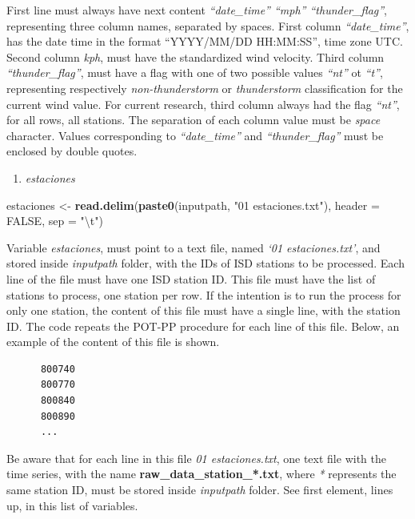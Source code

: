 \documentclass[12pt,oneside]{reedthesis}
\newenvironment{Shaded}{\begin{snugshade}}{\end{snugshade}}
\newcommand{\CharTok}[1]{\textcolor[rgb]{0.31,0.60,0.02}{#1}}
\newcommand{\DataTypeTok}[1]{\textcolor[rgb]{0.13,0.29,0.53}{#1}}
\newcommand{\KeywordTok}[1]{\textcolor[rgb]{0.13,0.29,0.53}{\textbf{#1}}}
\newcommand{\NormalTok}[1]{#1}
\newcommand{\OtherTok}[1]{\textcolor[rgb]{0.56,0.35,0.01}{#1}}
\newcommand{\StringTok}[1]{\textcolor[rgb]{0.31,0.60,0.02}{#1}}
\providecommand{\tightlist}{%
  \setlength{\itemsep}{0pt}\setlength{\parskip}{0pt}}
\begin{document}
First line must always have next content \emph{``date\_time'' ``mph'' ``thunder\_flag''}, representing three column names, separated by spaces. First column \emph{``date\_time''}, has the date time in the format ``YYYY/MM/DD HH:MM:SS'', time zone UTC. Second column \emph{kph}, must have the standardized wind velocity. Third column \emph{``thunder\_flag''}, must have a flag with one of two possible values \emph{``nt''} ot \emph{``t''}, representing respectively \emph{non-thunderstorm} or \emph{thunderstorm} classification for the current wind value. For current research, third column always had the flag \emph{``nt''}, for all rows, all stations. The separation of each column value must be \emph{space} character. Values corresponding to \emph{``date\_time''} and \emph{``thunder\_flag''} must be enclosed by double quotes.
\begin{enumerate}
\def\labelenumi{\arabic{enumi}.}
\setcounter{enumi}{1}
\tightlist
\item
  \emph{estaciones}
\end{enumerate}
\begin{Shaded}
\begin{Highlighting}[]
\NormalTok{estaciones <-}\StringTok{ }\KeywordTok{read.delim}\NormalTok{(}\KeywordTok{paste0}\NormalTok{(inputpath, }\StringTok{"01 estaciones.txt"}\NormalTok{), }
  \DataTypeTok{header =} \OtherTok{FALSE}\NormalTok{, }\DataTypeTok{sep =} \StringTok{"}\CharTok{\textbackslash{}t}\StringTok{"}\NormalTok{)}
\end{Highlighting}
\end{Shaded}
Variable \emph{estaciones}, must point to a text file, named \emph{`01 estaciones.txt'}, and stored inside \emph{inputpath} folder, with the IDs of ISD stations to be processed. Each line of the file must have one ISD station ID. This file must have the list of stations to process, one station per row. If the intention is to run the process for only one station, the content of this file must have a single line, with the station ID. The code repeats the POT-PP procedure for each line of this file. Below, an example of the content of this file is shown.
\begin{verbatim}
      800740
      800770
      800840
      800890
      ...
\end{verbatim}
Be aware that for each line in this file \emph{01 estaciones.txt}, one text file with the time series, with the name \textbf{raw\_data\_station\_*.txt}, where \emph{*} represents the same station ID, must be stored inside \emph{inputpath} folder. See first element, lines up, in this list of variables.
\end{document}
